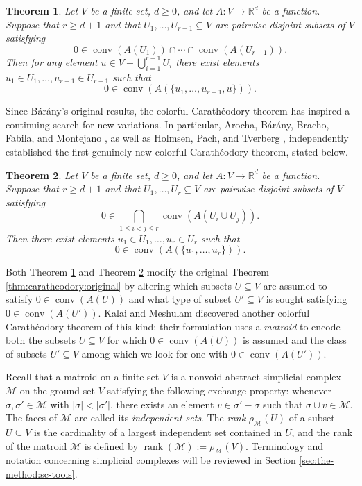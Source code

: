 \documentclass[a4paper,11pt,reqno, english]{amsart}
\newtheorem{theorem}{Theorem}[section]
\theoremstyle{definition}
\theoremstyle{remark}
\newcommand\R{\mathbb R}
\DeclareMathOperator{\conv}{\mathrm{conv}}
\begin{document}
\begin{theorem}\label{thm:caratheodory:fixed}
Let $V$ be a finite set, $d\geq 0$, and let $A\colon V\to\R^d$ be a function.
Suppose that $r\geq d+1$ and that $U_1,\ldots,U_{r-1}\subseteq V$ are  pairwise disjoint subsets of $V$ satisfying 
\[0\in\conv(A(U_1))\cap\cdots\cap\conv(A(U_{r-1})).\] 
Then for any element $u\in V-\bigcup_{i=1}^{r-1}U_i$ there exist elements $u_1\in U_1,\ldots,u_{r-1}\in U_{r-1}$ such that 
\[0\in\conv(A(\{u_1,\ldots,u_{r-1},u\})).\]
\end{theorem}

Since B\'ar\'any’s original results, the colorful Carath\'eodory theorem has inspired a continuing search for new variations.
In particular, Arocha, B\'ar\'any, Bracho, Fabila, and Montejano \cite[Thm.\,1]{ArochaBaranyBrachoFabilaMontejano2009}, as well as Holmsen, Pach, and Tverberg \cite[Thm.\,8]{HolmsenPachTverberg2008}, independently established the first genuinely new colorful Carath\'eodory theorem, stated below.

\begin{theorem}\label{thm:caratheodory:pair}
Let $V$ be a finite set, $d\geq 0$, and let $A\colon V\to\R^d$ be a function. 
Suppose that $r\geq d+1$ and that $U_1,\ldots,U_r\subseteq V$ are pairwise disjoint subsets of $V$  satisfying
\[0\in\bigcap_{1\leq i<j\leq r}\conv(A(U_i\cup U_j)).\] 
Then there exist elements $u_1\in U_1,\ldots,u_r\in U_r$ such that 
\[0\in\conv(A(\{u_1,\ldots,u_r\})).\]
\end{theorem}

Both Theorem \ref{thm:caratheodory:fixed} and Theorem \ref{thm:caratheodory:pair} modify the original Theorem \ref{thm:caratheodory:original} by altering which subsets $U\subseteq V$ are assumed to satisfy $0\in\conv(A(U))$ and what type of subset $U'\subseteq V$ is sought satisfying $0\in\conv(A(U'))$. 
Kalai and Meshulam \cite[Cor.\,1.4]{KalaiMeshulam2005} discovered another colorful Carath\'eodory theorem of this kind: their formulation uses a \emph{matroid} to encode both the subsets $U\subseteq V$ for which $0\in\conv(A(U))$ is assumed and the class of subsets $U'\subseteq V$ among  which we look for one with  $0\in\conv(A(U'))$.

\medskip
Recall that a matroid on a finite set $V$ is a nonvoid abstract simplicial complex $\mathscr{M}$ on the ground set $V$ satisfying the following exchange property: whenever $\sigma,\sigma'\in\mathscr{M}$ with $|\sigma|<|\sigma'|$, there exists an element $v\in\sigma'-\sigma$ such that $\sigma\cup{v}\in\mathscr{M}$.  The faces of $\mathscr{M}$ are called its \emph{independent sets}. The \emph{rank} $\rho_{\mathscr{M}}(U)$ of a subset $U\subseteq V$ is the cardinality of a largest independent set contained in $U$, and the rank of the matroid $\mathscr{M}$ is defined by $\operatorname{rank}(\mathscr{M}):=\rho_\mathscr{M}(V)$.
Terminology and notation concerning simplicial complexes will be reviewed in Section \ref{sec:the-method:sc-tools}. 
\end{document}
